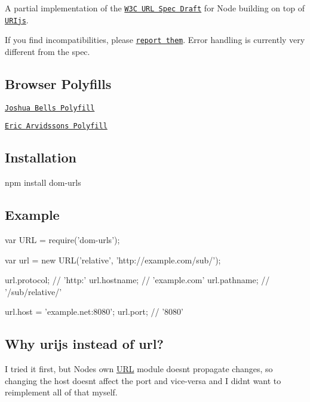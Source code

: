 \href{https://travis-ci.org/passy/node-dom-urls}{\tt } \href{https://codeclimate.com/github/passy/node-dom-urls}{\tt } \href{https://github.com/igrigorik/ga-beacon}{\tt }

A partial implementation of the \href{https://dvcs.w3.org/hg/url/raw-file/tip/Overview.html}{\tt W3C U\+RL Spec Draft} for Node building on top of \href{http://medialize.github.io/URI.js/}{\tt U\+R\+Ijs}.

If you find incompatibilities, please \href{https://github.com/passy/node-dom-urls/issues}{\tt report them}. Error handling is currently very different from the spec.

\subsection*{Browser Polyfills }


\begin{DoxyItemize}
\item \href{https://github.com/inexorabletash/polyfill/blob/master/url.js}{\tt Joshua Bell\textquotesingle{}s Polyfill}
\item \href{https://github.com/arv/DOM-URL-Polyfill}{\tt Eric Arvidsson\textquotesingle{}s Polyfill}
\end{DoxyItemize}

\subsection*{Installation }

{\ttfamily npm install dom-\/urls}

\subsection*{Example }


\begin{DoxyCode}
var URL = require('dom-urls');

var url = new URL('relative', 'http://example.com/sub/');

url.protocol; // 'http:'
url.hostname; // 'example.com'
url.pathname; // '/sub/relative/'

url.host = 'example.net:8080';
url.port; // '8080'
\end{DoxyCode}


\subsection*{Why {\ttfamily urijs} instead of {\ttfamily url}? }

I tried it first, but Node\textquotesingle{}s own \mbox{\hyperlink{namespace_u_r_l}{U\+RL}} module doesn\textquotesingle{}t propagate changes, so changing the {\ttfamily host} doesn\textquotesingle{}t affect the port and vice-\/versa and I didn\textquotesingle{}t want to reimplement all of that myself. 